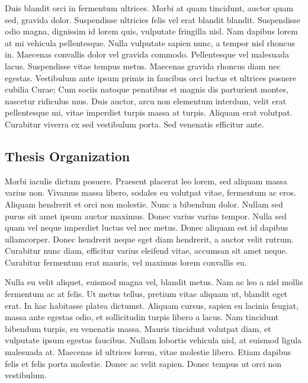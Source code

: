 Duis blandit orci in fermentum ultrices. Morbi at quam tincidunt, auctor quam sed, gravida dolor. Suspendisse ultricies felis vel erat blandit blandit. Suspendisse odio magna, dignissim id lorem quis, vulputate fringilla nisl. Nam dapibus lorem at mi vehicula pellentesque. Nulla vulputate sapien nunc, a tempor nisl rhoncus in. Maecenas convallis dolor vel gravida commodo. Pellentesque vel malesuada lacus. Suspendisse vitae tempus metus. Maecenas gravida rhoncus diam nec egestas. Vestibulum ante ipsum primis in faucibus orci luctus et ultrices posuere cubilia Curae; Cum sociis natoque penatibus et magnis dis parturient montes, nascetur ridiculus mus. Duis auctor, arcu non elementum interdum, velit erat pellentesque mi, vitae imperdiet turpis massa at turpis. Aliquam erat volutpat. Curabitur viverra ex sed vestibulum porta. Sed venenatis efficitur ante.

\subsection*{Thesis Organization}

Morbi iaculis dictum posuere. Praesent placerat leo lorem, sed aliquam massa varius non. Vivamus massa libero, sodales eu volutpat vitae, fermentum ac eros. Aliquam hendrerit et orci non molestie. Nunc a bibendum dolor. Nullam sed purus sit amet ipsum auctor maximus. Donec varius varius tempor. Nulla sed quam vel neque imperdiet luctus vel nec metus. Donec aliquam est id dapibus ullamcorper. Donec hendrerit neque eget diam hendrerit, a auctor velit rutrum. Curabitur nunc diam, efficitur varius eleifend vitae, accumsan sit amet neque. Curabitur fermentum erat mauris, vel maximus lorem convallis eu.

Nulla eu velit aliquet, euismod magna vel, blandit metus. Nam ac leo a nisl mollis fermentum ac at felis. Ut metus tellus, pretium vitae aliquam ut, blandit eget erat. In hac habitasse platea dictumst. Aliquam cursus, sapien eu lacinia feugiat, massa ante egestas odio, et sollicitudin turpis libero a lacus. Nam tincidunt bibendum turpis, eu venenatis massa. Mauris tincidunt volutpat diam, et vulputate ipsum egestas faucibus. Nullam lobortis vehicula nisl, at euismod ligula malesuada at. Maecenas id ultrices lorem, vitae molestie libero. Etiam dapibus felis et felis porta molestie. Donec ac velit sapien. Donec tempus ut orci non vestibulum.
